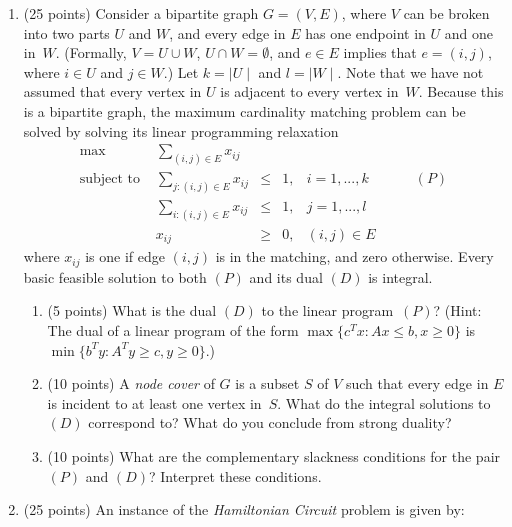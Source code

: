 \begin{enumerate}
  \item (25 points)
    Consider a bipartite graph $G=(V,E)$, where $V$ can be broken into
    two parts $U$ and $W$, and every edge in $E$ has one endpoint in $U$
    and one in~$W$.
    (Formally, $V=U\cup W$, $U\cap W =\emptyset$, and $e \in E$ implies that
    $e=(i,j)$, where $i\in U$ and $j\in W$.)
    Let $k=\mid\!U\!\mid$ and $l=\mid\!W\!\mid$.
    Note that we have not assumed %
    that every vertex in $U$ is adjacent to every vertex in~$W$.
    Because this is a bipartite graph, the maximum cardinality matching
    problem can be solved by solving its linear programming relaxation
    \begin{displaymath}
      \begin{array}{lrclrr}
        \max & \sum_{(i,j) \in E} x_{ij} \\
        \mbox{subject to } & \sum_{j:(i,j) \in E} x_{ij}
                                & \leq & 1, & i=1,...,k & \qquad (P) \\
                           & \sum_{i:(i,j) \in E} x_{ij}
                                & \leq & 1, & j=1,...,l \\
                           & x_{ij} & \geq & 0, & (i,j) \in E
      \end{array}
    \end{displaymath}
    where $x_{ij}$ is one if edge $(i,j)$ is in the matching,
    and zero otherwise.
    Every basic feasible solution to both $(P)$ and its dual $(D)$ is integral.
    \begin{enumerate}
      \item (5 points)
        What is the dual $(D)$ to the linear program~$(P)$?
        (Hint: The dual of a linear program of the form
        $\max\{c^Tx:Ax\leq b,x\geq 0\}$ is $\min\{b^Ty:A^Ty\geq c, y\geq 0\}$.)
      \item (10 points)
        A {\em node cover} of $G$ is a subset $S$ of $V$ such that every
        edge in $E$ is incident to at least one vertex in~$S$.
        What do the integral solutions to $(D)$ correspond to?
        What do you conclude from strong duality?
      \item (10 points)
        What are the complementary slackness conditions for the
        pair $(P)$ and $(D)$? Interpret these conditions.
    \end{enumerate}
  \item (25 points)
    An instance of the {\em Hamiltonian Circuit} problem is given by:

\end{enumerate}
